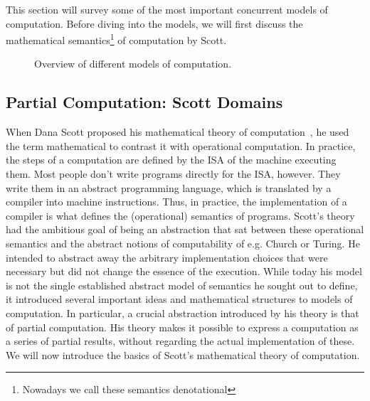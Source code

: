 This section will survey some of the most important concurrent models of computation. Before diving into the models, we will first discuss the mathematical semantics\footnote{Nowadays we call these semantics denotational} of computation by Scott.

\begin{figure}[h]
	\centering
   \resizebox{0.95\textwidth}{!}{}
	\caption{Overview of different models of computation.}
	\label{fig:dataflow_mocs}
\end{figure}



\subsection{Partial Computation: Scott Domains}

When Dana Scott proposed his mathematical theory of computation~\cite{scott1970}, he used the term mathematical to contrast it with operational computation.
In practice, the steps of a computation are defined by the \ac{ISA} of the machine executing them.
Most people don't write programs directly for the \ac{ISA}, however. They write them in an abstract programming language, which is translated by a compiler into machine instructions.
Thus, in practice, the implementation of a compiler is what defines the (operational) semantics of programs.
Scott's theory had the ambitious goal of being an abstraction that sat between these operational semantics and the abstract notions of computability of e.g. Church or Turing.
He intended to abstract away the arbitrary implementation choices that were necessary but did not change the essence of the execution.
While today his model is not the single established abstract model of semantics he sought out to define, it introduced several important ideas and mathematical structures to models of computation.
In particular, a crucial abstraction introduced by his theory is that of partial computation.
His theory makes it possible to express a computation as a series of partial results, without regarding the actual implementation of these.
We will now introduce the basics of Scott's mathematical theory of computation.


